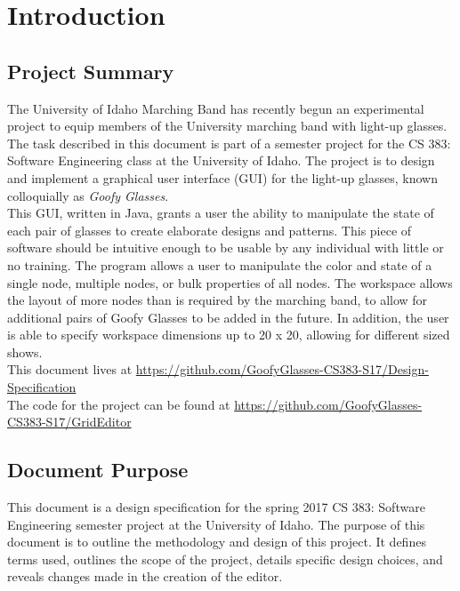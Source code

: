\documentclass[12pt]{article}
\begin{document}
	\tableofcontents
	\newpage
	
	\section{Introduction}
		\subsection{Project Summary}
  		The University of Idaho Marching Band has recently begun an experimental project to equip members of the University marching band with light-up glasses. The task described in this document is part of a semester project for the CS 383: Software Engineering class at the University of Idaho.  The project is to design and implement a graphical user interface (GUI) for the light-up glasses, known colloquially as \textit{Goofy Glasses}. \\
      This GUI, written in Java, grants a user the ability to manipulate the state of each pair of glasses to create elaborate designs and patterns. This piece of software should be intuitive enough to be usable by any individual with little or no training. The program allows a user to manipulate the color and state of a single node, multiple nodes, or bulk properties of all nodes. The workspace allows the layout of more nodes than is required by the marching band, to allow for additional pairs of Goofy Glasses to be added in the future. In addition, the user is able to specify workspace dimensions up to 20 x 20, allowing for different sized shows. \\
      This document lives at \url{https://github.com/GoofyGlasses-CS383-S17/Design-Specification} \\
      The code for the project can be found at \url{https://github.com/GoofyGlasses-CS383-S17/GridEditor}
		
		\subsection{Document Purpose}
  		This document is a design specification for the spring 2017 CS 383: Software Engineering semester project at the University of Idaho. The purpose of this document is to outline the methodology and design of this project. It defines terms used, outlines the scope of the project, details specific design choices, and reveals changes made in the creation of the editor. 
		
\end{document}
